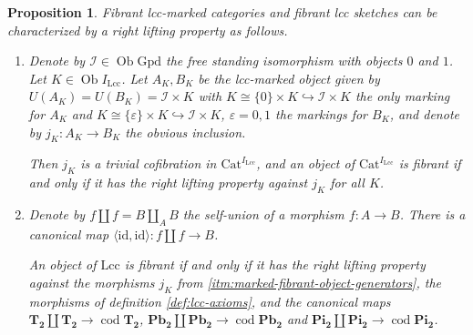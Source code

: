 \documentclass[a4paper]{article}
\newtheorem{proposition}[theorem]{Proposition}
\theoremstyle{remark}
\theoremstyle{definition}
\begin{document}
\begin{proposition}
  \label{prop:object-generating-triv-cof-lcc}
  Fibrant lcc-marked categories and fibrant lcc sketches can be characterized by a right lifting property as follows.
  \begin{enumerate}
    \item
      \label{itm:marked-fibrant-object-generators}
      Denote by $\mathcal{I} \in \operatorname{Ob} \mathrm{Gpd}$ the free standing isomorphism with objects $0$ and $1$.
      Let $K \in \operatorname{Ob} I_\mathrm{Lcc}$.
      Let $A_K, B_K$ be the lcc-marked object given by $U(A_K) = U(B_K) = \mathcal{I} \times K$ with $K \cong \{ 0 \} \times K \hookrightarrow \mathcal{I} \times K$ the only marking for $A_K$ and $K \cong \{ \varepsilon \} \times K \hookrightarrow \mathcal{I} \times K$, $\varepsilon = 0, 1$ the markings for $B_K$, and denote by $j_K : A_K \rightarrow B_K$ the obvious inclusion.

      Then $j_K$ is a trivial cofibration in $\mathrm{Cat}^{I_\mathrm{Lcc}}$, and an object of $\mathrm{Cat}^{I_\mathrm{Lcc}}$ is fibrant if and only if it has the right lifting property against $j_K$ for all $K$.
    \item
      \label{itm:lcc-fibrant-object-generators}
      Denote by $f \amalg f = B \amalg_A B$ the self-union of a morphism $f : A \rightarrow B$.
      There is a canonical map $\langle \mathrm{id}, \mathrm{id} \rangle : f \amalg f \rightarrow B$.

      An object of $\mathrm{Lcc}$ is fibrant if and only if it has the right lifting property against the morphisms $j_K$ from \ref{itm:marked-fibrant-object-generators}, the morphisms of definition \ref{def:lcc-axioms}, and the canonical maps $\mathbf{T_2} \amalg \mathbf{T_2} \rightarrow \operatorname{cod} \mathbf{T_2}$, $\mathbf{Pb_2} \amalg \mathbf{Pb_2} \rightarrow \operatorname{cod} \mathbf{Pb_2}$ and $\mathbf{Pi_2} \amalg \mathbf{Pi_2} \rightarrow \operatorname{cod} \mathbf{Pi_2}$.
  \end{enumerate}
\end{proposition}
\end{document}
